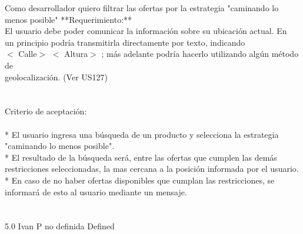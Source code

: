 	{Como desarrollador quiero filtrar las ofertas por la estrategia "caminando lo menos posible"} %
	{**Requerimiento:**\\
El usuario debe poder comunicar la información sobre su ubicación actual. En\\
un principio podría transmitirla directamente por texto, indicando\\
$<$ Calle$>$ $<$ Altura$>$ ; más adelante podría hacerlo utilizando algún método de\\
geolocalización. (Ver US127)\\
  \\
  \\
Criterio de aceptación:\\
  \\
* El usuario ingresa una búsqueda de un producto y selecciona la estrategia "caminando lo menos posible".  \\
* El resultado de la búsqueda será, entre las ofertas que cumplen las demás restricciones seleccionadas, la mas cercana a la posición informada por el usuario.\\
* En caso de no haber ofertas disponibles que cumplan las restricciones, se informará de esto al usuario mediante un mensaje. \\
  \\
  \\
} %
	{} %
	{5.0} %
	{Ivan P} %
	{no definida} %
	{Defined} %


\vspace{20pt}

